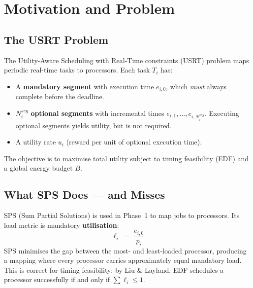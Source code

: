 \documentclass[10pt,twocolumn]{article}
\begin{document}

\section{Motivation and Problem}

\subsection{The USRT Problem}
The Utility-Aware Scheduling with Real-Time constraints (USRT) problem maps
periodic real-time tasks to processors. Each task $T_i$ has:
\begin{itemize}[nosep]
  \item A \textbf{mandatory segment} with execution time $e_{i,0}$, which
        \emph{must} always complete before the deadline.
  \item $N_i^{seg}$ \textbf{optional segments} with incremental times
        $e_{i,1},\ldots,e_{i,N_i^{seg}}$. Executing optional segments yields
        utility, but is not required.
  \item A utility rate $u_i$ (reward per unit of optional execution time).
\end{itemize}
The objective is to maximise total utility subject to timing feasibility (EDF)
and a global energy budget $B$.

\subsection{What SPS Does --- and Misses}

SPS (Sum Partial Solutions) is used in Phase~1 to map jobs to processors. Its
load metric is mandatory \textbf{utilisation}:
\[
  \ell_i \;=\; \frac{e_{i,0}}{p_i}
\]
SPS minimises the gap between the most- and least-loaded processor, producing
a mapping where every processor carries approximately equal mandatory load.
This is correct for timing feasibility: by Liu \& Layland, EDF schedules a
processor successfully if and only if $\sum \ell_i \leq 1$.
\end{document}
